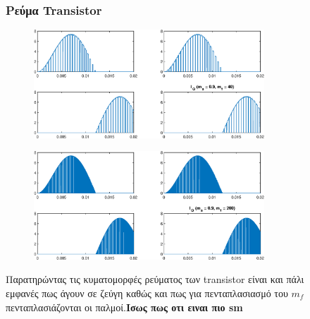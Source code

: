 \begin{figure}[h!]
	\subsubsection*{Ρεύμα Transistor}
	\begin{subfigure}{0.49\textwidth}
		\centering
		\includegraphics[width=0.95\textwidth]{Images/I_Q_40}
	\end{subfigure}
	\begin{subfigure}{0.49\textwidth}
		\centering
		\includegraphics[width=0.95\textwidth]{Images/I_Q_200}
	\end{subfigure}
	\noindent
	Παρατηρώντας τις κυματομορφές ρεύματος των transistor είναι και πάλι εμφανές πως άγουν σε ζεύγη καθώς και πως για πενταπλασιασμό του $m_f$ πενταπλασιάζονται οι παλμοί.\textbf{Ισως πως οτι ειναι πιο sm}
\end{figure}

